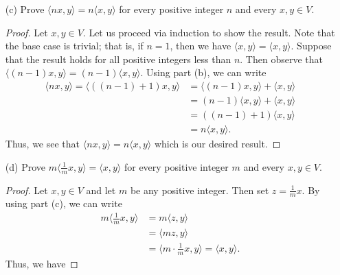 \begin{enumerate}
\begin{proof}
\begin{align*}
        \end{align*}
        \end{proof}
    \item[(c)] Prove \( \langle nx , y \rangle = n \langle x  , y \rangle  \) for every positive integer \( n  \) and every \( x,y \in V  \). 
        \begin{proof}
        Let \( x ,y \in V  \). Let us proceed via induction to show the result. Note that the base case is trivial; that is, if \( n = 1  \), then we have \( \langle x , y \rangle = \langle x , y \rangle \). Suppose that the result holds for all positive integers less than \( n  \). Then observe that \( \langle (n-1)x , y \rangle = (n-1) \langle x , y \rangle \). Using part (b), we can write
        \begin{align*}
            \langle nx , y \rangle = \langle (  (n-1) + 1  ) x , y \rangle &= \langle (n-1) x , y \rangle + \langle x , y \rangle   \\
                                                                           &= (n-1) \langle x , y \rangle + \langle x , y \rangle \\ 
                                                                           &= ((n-1) + 1) \langle x , y \rangle \\
                                                                           &= n \langle x , y \rangle.
        \end{align*}
        Thus, we see that \( \langle nx , y \rangle = n \langle x , y \rangle \) which is our desired result.
        \end{proof}
    \item[(d)] Prove \( m \langle \frac{ 1 }{ m }  x  , y \rangle = \langle x , y \rangle \) for every positive integer \( m  \) and every \( x,y \in V  \).
        \begin{proof}
        Let \( x,y \in V \) and let \( m  \) be any positive integer. Then set \( z = \frac{ 1 }{ m }  x  \). By using part (c), we can write
        \begin{align*}
            m \Big\langle \frac{ 1 }{ m }  x  , y \Big\rangle &= m \Big\langle z  , y \Big\rangle \\
                                                      &= \langle mz , y \rangle \\
                                                      &= \Big\langle m \cdot \frac{ 1 }{ m }  x  , y \Big\rangle = \langle x  , y \rangle.
        \end{align*}
        Thus, we have 

\end{proof}
\end{enumerate}

